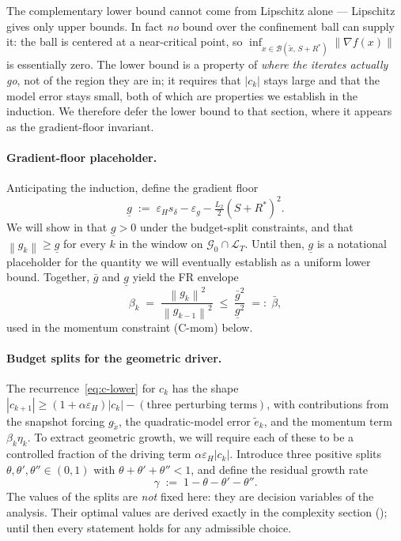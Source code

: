 \documentclass[11pt,a4paper]{article}
\theoremstyle{plain}
\theoremstyle{definition}
\newcommand{\norm}[1]{\left\|#1\right\|}
\newcommand{\eps}{\varepsilon}
\newcommand{\epsg}{\eps_{g}}
\newcommand{\epsH}{\eps_{H}}
\newcommand{\grad}{\nabla}
\newcommand{\Ltwo}{L_{2}}
\newcommand{\snap}{\tilde{x}}
\newcommand{\sdel}{s_{\delta}}
\newcommand{\glow}{\underline{g}}
\newcommand{\Rstar}{R^{*}}
\newcommand{\gup}{\bar g}
\newcommand{\bbeta}{\bar\beta}
\begin{document}
The complementary lower bound cannot come from Lipschitz alone --- Lipschitz
gives only upper bounds. In fact \emph{no} bound over the confinement ball can
supply it: the ball is centered at a near-critical point, so
$\inf_{x\in\mathcal{B}(\snap,\,S+\Rstar)}\norm{\grad f(x)}$ is essentially zero.
The lower bound is a property of \emph{where the iterates actually go}, not of
the region they are in; it requires that $|c_k|$ stays large and that the model
error stays small, both of which are properties we establish in the induction.
We therefore defer the lower bound to that section, where it appears as the
gradient-floor invariant.

\paragraph{Gradient-floor placeholder.}
Anticipating the induction, define the gradient floor
\begin{equation}\label{eq:glow-def}
\glow \;:=\; \epsH\sdel - \epsg - \tfrac{\Ltwo}{2}(S+\Rstar)^{2}.
\end{equation}
We will show in  that $\glow > 0$ under the budget-split
constraints, and that $\norm{g_k} \ge \glow$ for every $k$ in the window on
$\mathcal{G}_0 \cap \mathcal{L}_T$. Until then, $\glow$ is a notational
placeholder for the quantity we will eventually establish as a uniform lower
bound. Together, $\gup$ and $\glow$ yield the FR envelope
\begin{equation}\label{eq:bbeta-def}
\beta_{k} \;=\; \frac{\norm{g_{k}}^{2}}{\norm{g_{k-1}}^{2}}
\;\le\; \frac{\gup^{2}}{\glow^{2}} \;=:\; \bbeta ,
\end{equation}
used in the momentum constraint (C-mom) below.

\paragraph{Budget splits for the geometric driver.}
The recurrence~\eqref{eq:c-lower} for $c_k$ has the shape
$|c_{k+1}| \ge (1+\alpha\epsH)|c_k| - (\text{three perturbing terms})$, with
contributions from the snapshot forcing $g_{\snap}$, the quadratic-model
error $\tilde e_k$, and the momentum term $\beta_k\eta_k$. To extract
geometric growth, we will require each of these to be a controlled fraction
of the driving term $\alpha\epsH|c_k|$. Introduce three positive splits
$\theta,\theta',\theta'' \in (0,1)$ with $\theta+\theta'+\theta''<1$, and
define the residual growth rate
\begin{equation}\label{eq:gamma-def}
\gamma \;:=\; 1 - \theta - \theta' - \theta''.
\end{equation}
The values of the splits are \emph{not} fixed here: they are decision
variables of the analysis. Their optimal values are derived exactly in the
complexity section (); until then every statement holds
for any admissible choice.
\end{document}
